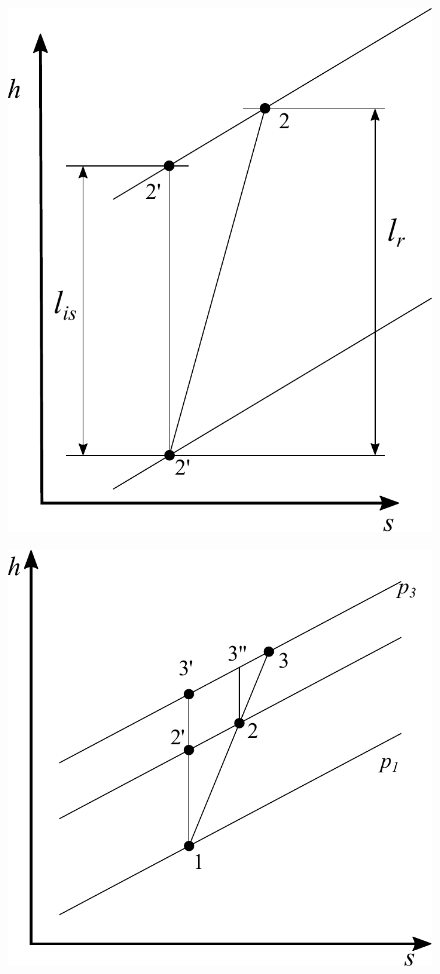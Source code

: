 \begin{figure}
\centering
\begin{minipage}{.45\textwidth}
  \centering
  \includegraphics[width=.9\linewidth]{fig/Rend1.pdf}
  \label{fig:Rend1}
\end{minipage}%
\begin{minipage}{.55\textwidth}
  \centering
  \includegraphics[width=.9\linewidth]{fig/Rend2.pdf}
  \label{fig:Rend2}
\end{minipage}
\end{figure}
